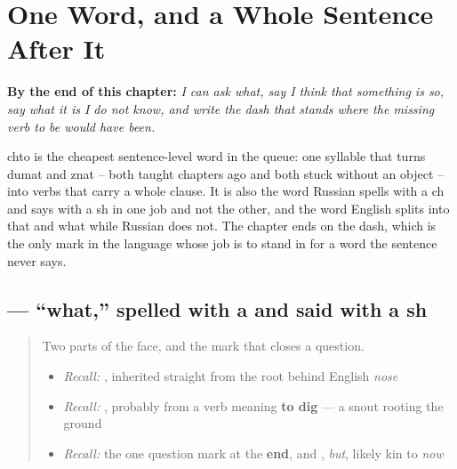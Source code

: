 
\chapter{One Word, and a Whole Sentence After It}
\label{ch:ru-chto}

\begin{chapteropening}
\textbf{By the end of this chapter:} \emph{I can ask what, say I think that something is so, say what it is I do not know, and write the dash that stands where the missing verb to be would have been.}

chto is the cheapest sentence-level word in the queue: one syllable that turns dumat and znat -- both taught chapters ago and both stuck without an object -- into verbs that carry a whole clause. It is also the word Russian spells with a ch and says with a sh in one job and not the other, and the word English splits into that and what while Russian does not. The chapter ends on the dash, which is the only mark in the language whose job is to stand in for a word the sentence never says.
\end{chapteropening}

\section[\texorpdfstring{\ru{что} (shto)}{что (shto)}]{ — \textquotedblleft{}what,\textquotedblright{} spelled with a  and said with a sh}

\label{lesson:RU-C18-chto-vopros}



\begin{quote}
Two parts of the face, and the mark that closes a question.

\begin{itemize}
\raggedright
  \item \emph{Recall:} \emph{}, inherited straight from the root behind English \emph{nose}
  \item \emph{Recall:} \emph{}, probably from a verb meaning \textbf{to dig} — a snout rooting the ground
  \item \emph{Recall:} the one question mark at the \textbf{end}, and \emph{}, \emph{but}, likely kin to \emph{now}
\end{itemize}
\end{quote}

